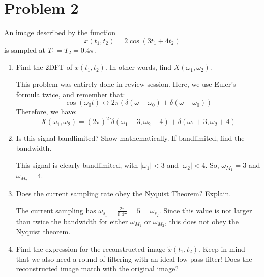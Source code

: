 \documentclass[10pt]{article}
\begin{document}
	\section*{Problem 2}
	An image described by the function 
	\[
	x(t_1, t_2) = 2\cos(3t_1 + 4t_2)
	\] 
	is sampled at \( T_1 = T_2 = 0.4\pi \). 
	\begin{enumerate}[label=\alph*)]
		\item Find the 2DFT of \( x(t_1, t_2) \). In other words, find \( X(\omega_1, \omega_2) \). 

			\begin{solution}
				This problem was entirely done in review session. Here, we use Euler's formula twice, and 
				remember that:
				\[
					\cos(\omega_0t) \longleftrightarrow 2\pi(\delta(\omega + \omega_0) + \delta(\omega - \omega_0))
				\] 
				Therefore, we have:
				\[
				X(\omega_1, \omega_2) = (2\pi)^2[\delta(\omega_1 - 3, \omega_2 - 4) + \delta(\omega_1 + 3, \omega_2 + 4)
				\] 
			\end{solution}
		\item Is this signal bandlimited? Show mathematically. If bandlimited, find the bandwidth. 

			\begin{solution}
				This signal is clearly bandlimited, with \( |\omega_1| < 3 \) and \( |\omega_2| < 4 \). So, 
				\( \omega_{M_1} = 3 \) and \( \omega_{M_2} = 4 \). 
			\end{solution}
		\item Does the current sampling rate obey the Nyquist Theorem? Explain.  

			\begin{solution}
				The current sampling has \( \omega_{s_1} = \frac{2\pi}{0.4\pi} = 5 = \omega_{s_2} \). Since this value 
				is not larger than twice the bandwidth for either \( \omega_{M_1} \) or \( \omega_{M_2} \), this 
				does not obey the Nyquist theorem. 
			\end{solution}
		\item Find the expression for the reconstructed image \( \tilde x(t_1, t_2) \). Keep in mind that 
			we also need a round of filtering with an ideal low-pass filter! Does the reconstructed 
			image match with the original image?  


\end{enumerate}
\end{document}
